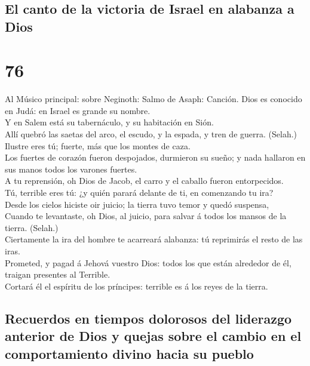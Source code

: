 \hypertarget{el-canto-de-la-victoria-de-israel-en-alabanza-a-dios}{%
\subsection{El canto de la victoria de Israel en alabanza a
Dios}\label{el-canto-de-la-victoria-de-israel-en-alabanza-a-dios}}

\hypertarget{section-19-76}{%
\section{76}\label{section-19-76}}

 Al Músico principal: sobre Neginoth: Salmo de Asaph:
Canción. Dios es conocido en Judá: en Israel es grande su nombre.\\
 Y en Salem está su tabernáculo, y su habitación en
Sión.\\
 Allí quebró las saetas del arco, el escudo, y la espada,
y tren de guerra. (Selah.)\\
 Ilustre eres tú; fuerte, más que los montes de caza.\\
 Los fuertes de corazón fueron despojados, durmieron su
sueño; y nada hallaron en sus manos todos los varones fuertes.\\
 A tu reprensión, oh Dios de Jacob, el carro y el caballo
fueron entorpecidos.\\
 Tú, terrible eres tú: ¿y quién parará delante de ti, en
comenzando tu ira?\\
 Desde los cielos hiciste oir juicio; la tierra tuvo temor
y quedó suspensa,\\
 Cuando te levantaste, oh Dios, al juicio, para salvar á
todos los mansos de la tierra. (Selah.)\\
 Ciertamente la ira del hombre te acarreará alabanza: tú
reprimirás el resto de las iras.\\
 Prometed, y pagad á Jehová vuestro Dios: todos los que
están alrededor de él, traigan presentes al Terrible.\\
 Cortará él el espíritu de los príncipes: terrible es á
los reyes de la tierra.

\hypertarget{recuerdos-en-tiempos-dolorosos-del-liderazgo-anterior-de-dios-y-quejas-sobre-el-cambio-en-el-comportamiento-divino-hacia-su-pueblo}{%
\subsection{Recuerdos en tiempos dolorosos del liderazgo anterior de
Dios y quejas sobre el cambio en el comportamiento divino hacia su
pueblo}\label{recuerdos-en-tiempos-dolorosos-del-liderazgo-anterior-de-dios-y-quejas-sobre-el-cambio-en-el-comportamiento-divino-hacia-su-pueblo}}

